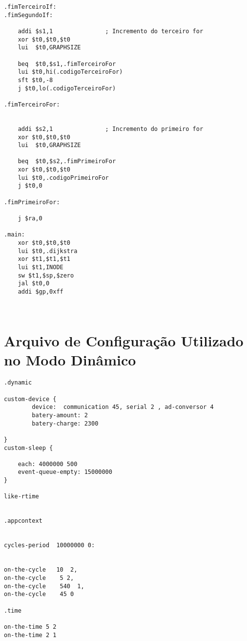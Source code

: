 \begin{verbatim}
.fimTerceiroIf:
.fimSegundoIf:

    addi $s1,1               ; Incremento do terceiro for
    xor $t0,$t0,$t0 
    lui  $t0,GRAPHSIZE
    
    beq  $t0,$s1,.fimTerceiroFor  
    lui $t0,hi(.codigoTerceiroFor)
    sft $t0,-8
    j $t0,lo(.codigoTerceiroFor)

.fimTerceiroFor:


    addi $s2,1               ; Incremento do primeiro for
    xor $t0,$t0,$t0 
    lui  $t0,GRAPHSIZE
    
    beq  $t0,$s2,.fimPrimeiroFor  
    xor $t0,$t0,$t0     
    lui $t0,.codigoPrimeiroFor  
    j $t0,0

.fimPrimeiroFor:

    j $ra,0

.main:
    xor $t0,$t0,$t0
    lui $t0,.dijkstra
    xor $t1,$t1,$t1  
    lui $t1,INODE
    sw $t1,$sp,$zero
    jal $t0,0
    addi $gp,0xff 



\end{verbatim}

\section{Arquivo de Configuração Utilizado no Modo Dinâmico}
\scriptsize
\begin{verbatim}
.dynamic

custom-device { 
        device:  communication 45, serial 2 , ad-conversor 4 
        batery-amount: 2 
        batery-charge: 2300 
         
} 
custom-sleep { 
	
    each: 4000000 500
    event-queue-empty: 15000000
} 

like-rtime


.appcontext


cycles-period  10000000 0:  


on-the-cycle   10  2,  
on-the-cycle    5 2, 
on-the-cycle    540  1,
on-the-cycle    45 0 

.time

on-the-time 5 2
on-the-time 2 1

\end{verbatim}
















